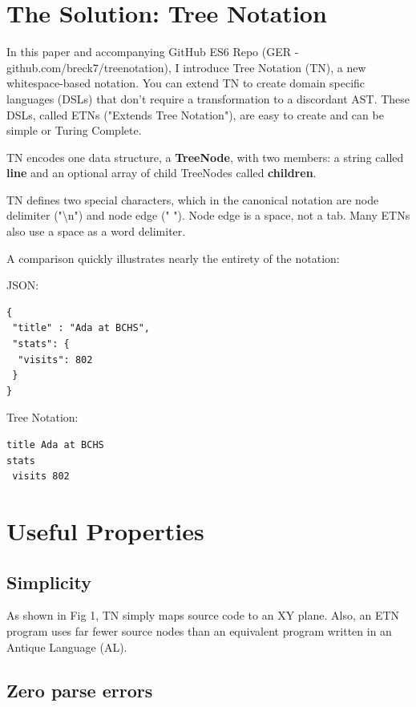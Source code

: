 \documentclass[journal]{IEEEtran}
\begin{document}
\section{The Solution: Tree Notation}

In this paper and accompanying GitHub ES6 Repo (GER - github.com/breck7/treenotation), I introduce Tree Notation (TN), a new whitespace-based notation. You can extend TN to create domain specific languages (DSLs) that don't require a transformation to a discordant AST. These DSLs, called ETNs ("Extends Tree Notation"), are easy to create and can be simple or Turing Complete.

TN encodes one data structure, a \textbf{TreeNode}, with two members: a string called \textbf{line} and an optional array of child TreeNodes called \textbf{children}.

TN defines two special characters, which in the canonical notation are node delimiter ("\textbackslash n") and node edge (" "). Node edge is a space, not a tab. Many ETNs also use a space as a word delimiter.

A comparison quickly illustrates nearly the entirety of the notation:

JSON:

\begin{lstlisting}
{
 "title" : "Ada at BCHS",
 "stats": {
  "visits": 802
 }
}
\end{lstlisting}

Tree Notation:

\begin{lstlisting}
title Ada at BCHS
stats
 visits 802
\end{lstlisting}

\section{Useful Properties}

\subsection{Simplicity}

As shown in Fig 1, TN simply maps source code to an XY plane. Also, an ETN program uses far fewer source nodes than an equivalent program written in an Antique Language (AL).

\subsection{Zero parse errors}
\end{document}
